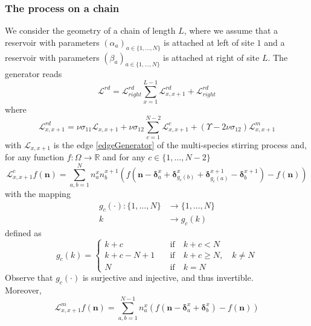 \documentclass[10pt]{article}
\numberwithin{equation}{section}
\numberwithin{equation}{subsection}
\begin{document}
\subsubsection{The process on a chain}
We consider the geometry of a chain of length $L$, where we assume that a reservoir with parameters $(\alpha_{a})_{a\in\{1,\ldots,N\}}$ is attached at left of site $1$ and a reservoir with parameters $(\beta_{a})_{a\in\{1,\ldots,N\}}$ is attached at right of site $L$. The generator reads
\begin{equation}\label{RDGenerator}
	\mathcal{L}^{rd}=\mathcal{L}_{right}^{rd}\sum_{x=1}^{L-1}\mathcal{L}_{x,x+1}^{rd}+\mathcal{L}_{right}^{rd}
\end{equation}
where
\begin{equation}\label{edgeGeneratorRD}
	\mathcal{L}_{x,x+1}^{rd}=\nu \sigma_{11}\mathcal{L}_{x,x+1}+\nu \sigma_{12}\sum_{c=1}^{N-2}\mathcal{L}_{x,x+1}^{c}+(\Upsilon-2\nu\sigma_{12})\mathcal{L}_{x,x+1}^{m}
\end{equation}
with $\mathcal{L}_{x,x+1}$ is the edge \eqref{edgeGenerator} of the multi-species stirring process and, for any function $f:\Omega\to \mathbb{R}$ and for any $c\in \{1,\ldots,N-2\}$
\begin{equation}
	\mathcal{L}_{x,x+1}^{c}f(\bm{n})=\sum_{a,b=1}^{N}n_{a}^{x}n_{b}^{x+1}\left(f(\bm{n}-\bm{\delta}_{a}^{x}+\bm{\delta}_{g_{c}(b)}^{x}+\bm{\delta}_{g_{c}(a)}^{x+1}-\bm{\delta}_{b}^{x+1})-f(\bm{n})\right)
\end{equation}
with the mapping 
\begin{equation}
	\begin{split}
		g_{c}(\cdot):\{1,\ldots,N\}&\to\{1,\ldots,N\}\\
		k&\to g_{c}(k)
	\end{split}
\end{equation}
defined as
\begin{equation}
	g_{c}(k)=\begin{cases}
		k+c \quad &\text{if}\quad k+c< N \\
		k+c-N+1\quad &\text{if}\quad k+c\geq N,\quad k\neq N\\
		N\quad &\text{if}\quad k=N
	\end{cases}
\end{equation}
Observe that $g_{c}(\cdot)$ is surjective and injective, and thus invertible. \\
Moreover,
\begin{equation}
	\mathcal{L}_{x,x+1}^{m}f(\bm{n})=\sum_{a,b=1}^{N-1}n_{a}^{x}\left(f(\bm{n}-\bm{\delta}_{a}^{x}+\bm{\delta}_{b}^{x})-f(\bm{n})\right)
\end{equation}
\end{document}
